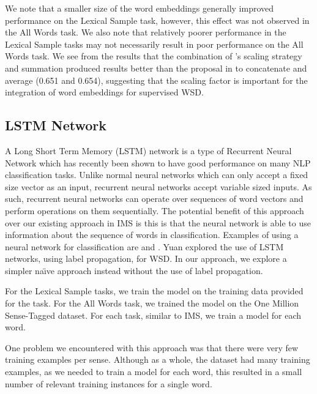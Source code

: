 We note that a smaller size of the word embeddings generally improved
performance on the Lexical Sample task, however, this effect was not
observed in the All Words task. We also note that relatively poorer
performance in the Lexical Sample tasks may not necessarily result in
poor performance on the All Words task. We see from the results that
the combination of \cite{Taghipour15}'s scaling strategy and summation
produced results better than the proposal in \cite{Iacobacci2016} to
concatenate and average (0.651 and 0.654), suggesting that the scaling
factor is important for the integration of word embeddings for
supervised WSD.

\subsection{LSTM Network}

A Long Short Term Memory (LSTM) network is a type of Recurrent Neural
Network which has recently been shown to have good performance on many
NLP classification tasks. Unlike normal neural networks which can only
accept a fixed size vector as an input, recurrent neural networks
accept variable sized inputs. As such, recurrent neural networks can
operate over sequences of word vectors and perform operations on them
sequentially. The potential benefit of this approach over our existing
approach in IMS is this is that the neural network is able to use
information about the sequence of words in classification. Examples of
using a neural network for classification are
\cite{socher2011parsing} and \cite{socher2013recursive}.  
Yuan  explored the use of LSTM networks, using
label propagation, for WSD. In our approach, we explore a simpler
na\"{\i}ve approach instead without the use of label propagation.

For the Lexical Sample tasks, we train the model on the training data
provided for the task. For the All Words task, we trained the model on
the One Million Sense-Tagged dataset. For each task, similar to IMS,
we train a model for each word.

One problem we encountered with this approach was that there were very
few training examples per sense. Although as a whole, the dataset had
many training examples, as we needed to train a model for each word,
this resulted in a small number of relevant training instances for a
single word.

